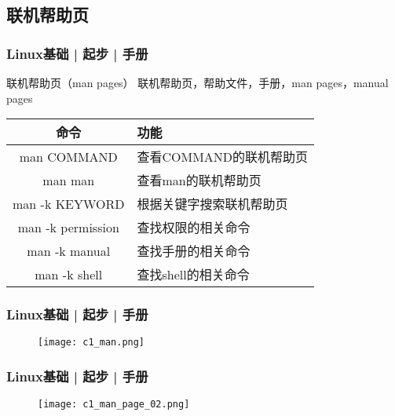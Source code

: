 \subsection{联机帮助页}
\begin{frame}
  \frametitle{Linux基础 | 起步 | 手册}
  \begin{block}{联机帮助页（man pages）}
    联机帮助页，帮助文件，手册，man pages，manual pages
  \end{block}
  \pause
  \begin{table}
    \centering
    \begin{tabular}{cl}
      \hline
      \rowcolor{blue!50}命令 & 功能\\
      \hline
      \alert{man COMMAND} & 查看COMMAND的联机帮助页\\
      man man & 查看man的联机帮助页\\
      \hline
      \alert{man -k KEYWORD} & 根据关键字搜索联机帮助页\\
      man -k permission & 查找权限的相关命令\\
      man -k manual & 查找手册的相关命令\\
      man -k shell & 查找shell的相关命令\\
      \hline
    \end{tabular}
  \end{table}
\end{frame}

\begin{frame}
  \frametitle{Linux基础 | 起步 | 手册}
  \begin{figure}
    \centering
    \texttt{[image: c1\_man.png]}
  \end{figure}
\end{frame}

\begin{frame}
  \frametitle{Linux基础 | 起步 | 手册}
  \begin{figure}
    \centering
    \texttt{[image: c1\_man\_page\_02.png]}
  \end{figure}
\end{frame}

